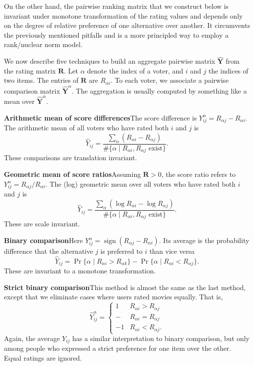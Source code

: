 \documentclass{sig-alternate}
\newcommand{\mat}{\boldsymbol}
\providecommand{\mYhat}{\ensuremath{\mat{\hat{\mY}}}}
\providecommand{\mR}{\ensuremath{\mat{R}}}
\providecommand{\mY}{\ensuremath{\mat{Y}}}
\begin{document}
On the other hand, the pairwise ranking matrix that
we construct below is invariant under monotone transformation
of the rating values and depends only on the degree of
relative preference of one alternative over another.
It circumvents the previously mentioned pitfalls and is
a more principled way to employ a rank/nuclear norm model.

We now describe five techniques to build an aggregate pairwise
matrix $\mYhat$ from the rating matrix $\mR$.  
Let $\alpha$ denote the index of a voter, and $i$ and $j$ the 
indices of two items.  The entries of $\mR$ are $R_{\alpha i}$.
To each voter, we associate a pairwise comparison matrix $\mYhat^\alpha$.
The aggregation
is usually computed by something like a mean over $\mYhat^\alpha$.



\begin{compactenum}
\item \textbf{Arithmetic mean of score differences}\quad The score difference
is $Y^{\alpha}_{ij} = R_{\alpha j}-R_{\alpha i}$. The arithmetic mean
of all voters who have rated both $i$ and $j$ is
\[
\hat{Y}_{ij}=\frac{\sum_{\alpha}(R_{\alpha i}-R_{\alpha j})}{\#\{\alpha\mid
R_{\alpha i},R_{\alpha j}\text{ exist}\}}.
\]
These comparisons  are translation invariant.

\item \textbf{Geometric mean of score ratios}\quad Assuming $\mR>0$, the score ratio
refers to $Y^{\alpha}_{ij} = R_{\alpha j}/R_{\alpha i}$. The (log) geometric
mean over all voters who have rated both $i$ and $j$ is
\[
\hat{Y}_{ij}=\frac{\sum_{\alpha}(\log R_{\alpha i} -\log R_{\alpha j}
)}{\#\{\alpha\mid R_{\alpha i},R_{\alpha j}\text{ exist}\}}.
\]
These are  scale invariant.

\item \textbf{Binary comparison}\quad Here $Y^{\alpha}_{ij} = \operatorname*{sign}(R_{\alpha j} - R_{\alpha i} )$. Its average is the probability difference
that the alternative $j$ is preferred to $i$ than vice versa
\[
\hat{Y}_{ij}=\Pr\{\alpha\mid R_{\alpha i}>R_{\alpha k}\}-\Pr\{\alpha\mid
R_{\alpha i}<R_{\alpha j}\}.
\]
These are invariant to a monotone transformation.

\item \textbf{Strict binary comparison}\quad This method is almost the same
as the last method, except that we eliminate cases where users rated
movies equally.  That is, 
\[ \hat{Y}^\alpha_{ij} = \begin{cases} 1 & R_{\alpha i} > R_{\alpha j} \\
                                 - & R_{\alpha i} = R_{\alpha j} \\
                                 -1 & R_{\alpha i} < R_{\alpha j}.
                   \end{cases} \]
Again, the average $Y_{ij}$ has a similar interpretation to
binary comparison, but only among people who expressed a strict 
preference for one item over the other.  
Equal ratings are ignored.


\end{compactenum}
\end{document}
